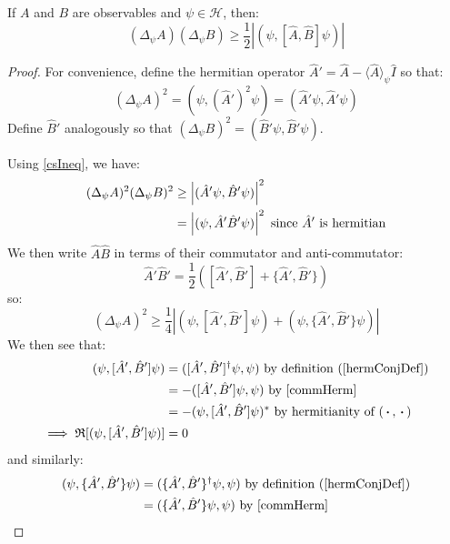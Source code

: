 \documentclass[../main.tex]{subfiles}
\begin{document}
\begin{theorem}
  If $A$ and $B$ are observables and $\psi \in \mathcal{H}$, then:
  \[
    (\Delta_{\psi} A)(\Delta_{\psi} B) \geq \frac{1}{2} |(\psi, [\hat{A}, \hat{B}]\psi)|
  \]
\end{theorem}
\begin{proof}
  For convenience, define the hermitian operator $\hat{A}' = \hat{A} - \langle \hat{A} \rangle_{\psi}\hat{I}$ so that:
  \[
    (\Delta_{\psi} A)^2 = (\psi, (\hat{A}')^2 \psi) = (\hat{A}'\psi, \hat{A}' \psi)
  \]
  Define $\hat{B}'$ analogously so that $(\Delta_{\psi} B)^2 = (\hat{B}' \psi, \hat{B}'\psi)$.

  Using \cref{csIneq}, we have:
  \begin{align*}
    (\Delta_{\psi} A)^2(\Delta_{\psi} B)^2 &\geq \left\lvert (\hat{A}' \psi, \hat{B}' \psi) \right\rvert^2 \\
                                           &= \left\lvert (\psi, \hat{A}' \hat{B}' \psi) \right\rvert^2 \text{ since $\hat{A}'$ is hermitian}
  \end{align*}
  We then write $\hat{A}\hat{B}$ in terms of their commutator and anti-commutator:
  \[
    \hat{A}' \hat{B}' = \frac{1}{2} ([\hat{A}', \hat{B}'] + \{\hat{A}', \hat{B}'\})
  \]
  so:
  \begin{equation}
    (\Delta_{\psi} A)^2 \geq \frac{1}{4} |(\psi, [\hat{A}', \hat{B}']\psi) + (\psi, \{\hat{A}', \hat{B}'\}\psi)| \label{absEqn} \tag{\dag}
  \end{equation}
  We then see that:
  \begin{align*}
    (\psi, [\hat{A}', \hat{B}'] \psi) &= ([\hat{A}', \hat{B}']^{\dag} \psi, \psi) \text{ by definition (\cref{hermConjDef})} \\
                                      &= -([\hat{A}', \hat{B}'] \psi, \psi) \text{ by \cref{commHerm}} \\
                                      &= -(\psi, [\hat{A}', \hat{B}']\psi)^{*} \text{ by hermitianity of $(\argdot, \argdot)$} \\
    \implies \Re[(\psi, [\hat{A}', \hat{B}'] \psi)] &= 0
  \end{align*}
  and similarly:
  \begin{align*}
    (\psi, \{\hat{A}', \hat{B}'\} \psi) &= (\{\hat{A}', \hat{B}'\}^{\dag} \psi, \psi) \text{ by definition (\cref{hermConjDef})} \\
                                        &= (\{\hat{A}', \hat{B}'\} \psi, \psi) \text{ by \cref{commHerm}} \\

\end{align*}
\end{proof}
\end{document}
